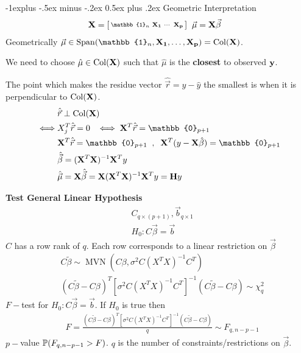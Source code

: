 \documentclass[letter, fleqn]{article}
\makeatletter
\renewcommand{\subsection}{\@startsection{subsection}{2}{0mm}%
                                {-1explus -.5ex minus -.2ex}%
                                {0.5ex plus .2ex}%
                                {\normalfont\normalsize\bfseries}}
\renewcommand{\v}{\Vec}
\newcommand{\MVN}{\operatorname{MVN}}
\makeatother
\begin{document}
\begin{multicols}{3}
\subsection{Geometric Interpretation}
\begin{align*}
    &\vb{X} = \smqty[\mathbb{1}_n & \vb{X_1} & \cdots &\vb{X_p}]\;\;\v{\mu} = \vb{X}\v{\beta}
\end{align*}
Geometrically $\v{\mu} \in \Span(\mathbb{1}_n , \vb{X_1} , \ldots ,\vb{X_p}) = \Col(\vb{X})$. 

We need to choose $\hat{\mu} \in \Col(\vb{X})$ such that $\hat{\mu}$ is the \textbf{closest} to observed $\vb{y}$. 

The point which makes the residue vector $\hat{\v{r}} = y - \hat{y}$ the smallest is when it is perpendicular to $\Col(\vb{X})$. 
\begin{align*}
    &\hat{\v{r}}\perp\Col(\vb X)\\
    \iff &X_j^T\hat{\v{r}} = 0 \;\; \iff  \vb{X}^T\hat{\v{r}} = \mathbb{0}_{p+1}\\
    &\vb{X}^T\hat{\v{r}} = \mathbb{0}_{p+1} \;\;,\;\; \vb{X}^T(y - \vb{X}\hat\beta) = \mathbb{0}_{p+1}\\
    &\hat{\v{\beta}} = (\vb{X}^T\vb{X})^{-1}\vb{X}^Ty\\
    &\hat{\v{\mu}} = \vb{X}\hat{\v{\beta}} = \vb{X}(\vb{X}^T\vb{X})^{-1}\vb{X}^Ty = \vb{H}y
\end{align*}

\textbf{Test General Linear Hypothesis}
\begin{align*}
    &C_{q \times (p + 1)}, \v{b}_{q\times 1}\\
    &H_0: C\v\beta = \v{b}
\end{align*}
$C$ has a row rank of $q$. Each row  corresponds to a linear restriction on $\v\beta$
\begin{align*}
&C\tilde{\beta} \sim  \MVN(C\beta, \sigma^2 C(X^TX)^{-1}C^T)\\
&(C\tilde{\beta} - C\beta)^T[\sigma^2 C(X^TX)^{-1}C^T]^{-1}(C\tilde{\beta} - C\beta) \sim \chi^2_q
\end{align*}
$F-$test for $H_0: C\v{\beta} = \v b$. If $H_0$ is true then
\begin{align*}
    &F =\frac{(C\tilde{\beta} - C\beta)^T[\sigma^2 C(X^TX)^{-1}C^T]^{-1}(C\tilde{\beta} - C\beta)}{q} \sim F_{q, n-p-1}
\end{align*}
$p-$value $\P(F_{q, n-p-1} > F)$. $q$ is the number of constraints/restrictions on $\v{\beta}$. 


\end{multicols}
\end{document}
